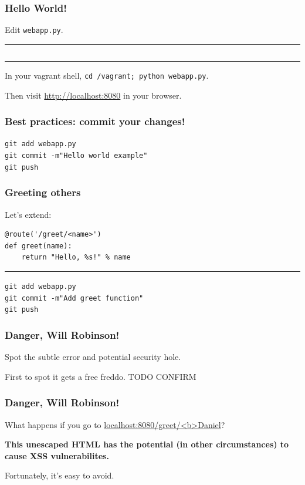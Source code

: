 \documentclass{beamer}
\begin{document}
\begin{frame}
  \frametitle{Hello World!}
  Edit \texttt{webapp.py}.
\hrule
  \inputminted{python}{../steps/01-hello-world/01-webapp.py}
\hrule
In your vagrant shell, \texttt{cd /vagrant; python webapp.py}.

Then visit \url{http://localhost:8080} in your browser.
\end{frame}

\begin{frame}
\frametitle{Best practices: commit your changes!}
\texttt{git add webapp.py}\\
\texttt{git commit -m"Hello world example"}\\
\texttt{git push}
\end{frame}

\begin{frame}[fragile]
  \frametitle{Greeting others}
  Let's extend:
  \begin{verbatim}
@route('/greet/<name>')
def greet(name):
    return "Hello, %s!" % name
  \end{verbatim}

  \hrule
  \texttt{git add webapp.py}\\
  \texttt{git commit -m"Add greet function"}\\
  \texttt{git push}
\end{frame}

\begin{frame}
  \frametitle{Danger, Will Robinson!}
  Spot the subtle error and potential security hole.

  First to spot it gets a free freddo. TODO CONFIRM
\end{frame}

\begin{frame}
  \frametitle{Danger, Will Robinson!}

  What happens if you go to \url{localhost:8080/greet/<b>Daniel}?

  \textbf{This unescaped HTML has the potential (in other
    circumstances) to cause XSS vulnerabilites.}

  Fortunately, it's easy to avoid.
\end{frame}

\end{document}
